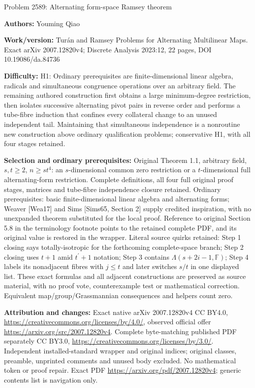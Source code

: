 \documentclass[10pt]{article}
\newcommand{\F}{\mathbb{F}}
\begin{document}
\begin{center}\Large Problem 2589: Alternating form-space Ramsey theorem\end{center}
\noindent\textbf{Authors:} Youming Qiao\par
\noindent\textbf{Work/version:} Tur\'an and Ramsey Problems for Alternating Multilinear Maps. Exact arXiv 2007.12820v4; Discrete Analysis 2023:12, 22 pages, DOI 10.19086/da.84736\par
\noindent\textbf{Difficulty:} H1: Ordinary prerequisites are finite-dimensional linear algebra, radicals and simultaneous congruence operations over an arbitrary field. The remaining authored construction first obtains a large minimum-degree restriction, then isolates successive alternating pivot pairs in reverse order and performs a tube-fibre induction that confines every collateral change to an unused independent tail. Maintaining that simultaneous independence is a nonroutine new construction above ordinary qualification problems; conservative H1, with all four stages retained.\par
\noindent\textbf{Selection and ordinary prerequisites:} Original Theorem 1.1, arbitrary field, $s,t\geq2$, $n\geq st^4$: an $s$-dimensional common zero restriction or a $t$-dimensional full alternating-form restriction. Complete definitions, all four full original proof stages, matrices and tube-fibre independence closure retained. Ordinary prerequisites: basic finite-dimensional linear algebra and alternating forms; Weaver [Wea17] and Sims [Sims65, Section 2] supply credited inspiration, with no unexpanded theorem substituted for the local proof. Reference to original Section 5.8 in the terminology footnote points to the retained complete PDF, and its original value is restored in the wrapper. Literal source quirks retained: Step 1 closing says totally-isotropic for the forthcoming complete-space branch; Step 2 closing uses $t+1$ amid $t^\prime+1$ notation; Step 3 contains $\Lambda(s+2i-1,\F)$; Step 4 labels its nonadjacent fibres with $j\leq t$ and later switches $s/t$ in one displayed list. These exact formulas and all adjacent constructions are preserved as source material, with no proof vote, counterexample test or mathematical correction. Equivalent map/group/Grassmannian consequences and helpers count zero.\par
\noindent\textbf{Attribution and changes:} Exact native arXiv 2007.12820v4 CC BY4.0, \url{https://creativecommons.org/licenses/by/4.0/}, observed official offer \url{https://arxiv.org/src/2007.12820v4}. Complete byte-matching published PDF separately CC BY3.0, \url{https://creativecommons.org/licenses/by/3.0/}. Independent installed-standard wrapper and original indices; original classes, preamble, unprinted comments and unused body excluded. No mathematical token or proof repair. Exact PDF \url{https://arxiv.org/pdf/2007.12820v4}; generic contents list is navigation only.\par
\end{document}
